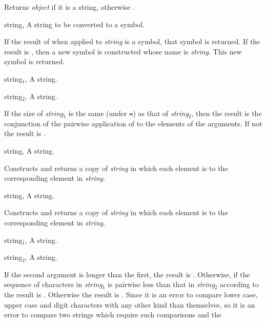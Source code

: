 \begin{optDefinition}
%
\result
Returns {\em object\/} if it is a string, otherwise \nil{}.
%
\begin{specargs}
    \item[string, \classref{string}] A string to be converted to a symbol.
\end{specargs}
%
\result
If the result of  when applied to {\em string\/}
is a symbol, that symbol is returned.  If the result is \nil{}, then
a new symbol is constructed whose name is {\em string}.  This new
symbol is returned.
%
%
\begin{specargs}
    \item[string$_1$, \classref{string}] A string.
    \item[string$_2$, \classref{string}] A string.
\end{specargs}
%
\result
If the size of {\em string$_1$} is the same (under {\tt =}) as that of
{\em string$_2$}, then the result is the conjunction of the pairwise
application of  to the elements of the arguments.  If not
the result is \nil{}.
%
%
\begin{specargs}
    \item[string, \classref{string}] A string.
\end{specargs}
%
\result
Constructs and returns a copy of {\em string\/} in which each element
is  to the corresponding element in {\em string}.
%
%
\begin{specargs}
    \item[string, \classref{string}] A string.
\end{specargs}
%
\result
Constructs and returns a copy of {\em string\/} in which each element
is  to the corresponding element in {\em string}.
%
%
\begin{specargs}
    \item[string$_1$, \classref{string}] A string.
    \item[string$_2$, \classref{string}] A string.
\end{specargs}
%
\result%
If the second argument is longer than the first, the result is \nil{}.
Otherwise, if the sequence of characters in {\em string$_1$} is pairwise less
than that in {\em string$_2$} according to  the result is
\true.  Otherwise the result is \nil{}.  Since it is an error to compare lower
case, upper case and digit characters with any other kind than themselves, so it
is an error to compare two strings which require such comparisons and the

\end{optDefinition}

